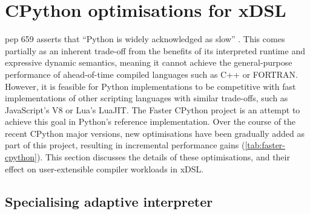 \chapter{CPython optimisations for xDSL}
\label{chap:impact-cpython-pattern-rewriting}

\acf{pep} 659 asserts that ``Python is widely acknowledged as slow'' \cite{pep659}.
This comes partially as an inherent trade-off from the benefits of its interpreted runtime and expressive dynamic semantics, meaning it cannot achieve the general-purpose performance of ahead-of-time compiled languages such as C++ or FORTRAN. However, it is feasible for Python implementations to be competitive with fast implementations of other scripting languages with similar trade-offs, such as JavaScript's V8 or Lua's LuaJIT. The Faster CPython project is an attempt to achieve this goal in Python's reference implementation. Over the course of the recent CPython major versions, new optimisations have been gradually added as part of this project, resulting in incremental performance gains (\autoref{tab:faster-cpython}).
This section discusses the details of these optimisations, and their effect on user-extensible compiler workloads in xDSL.


\section{Specialising adaptive interpreter}
\label{sec:specialising-adaptive-interpreter}

